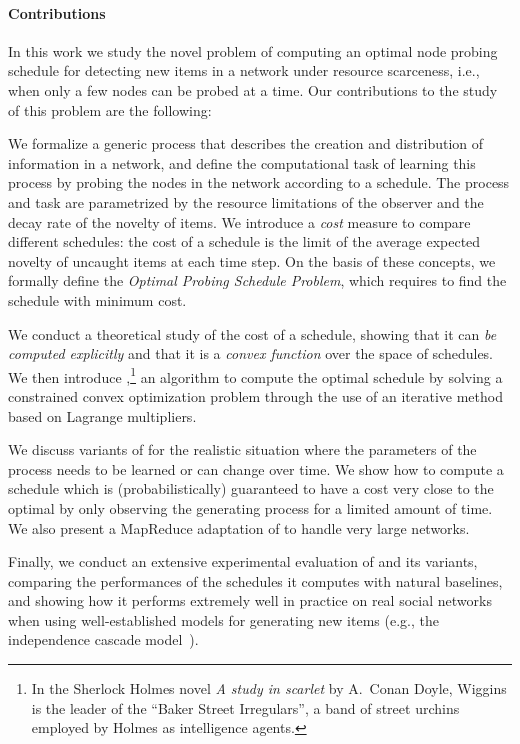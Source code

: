 \paragraph*{Contributions}
In this work we study the novel problem of computing an optimal node probing
schedule for detecting new items in a network under resource scarceness, i.e.,
when only a few nodes can be probed at a time. Our contributions to the study of
this problem are the following:

\begin{itemize*}
	\item We formalize a generic process that describes the creation and
		distribution of information in a network, and define the computational task of
		learning this process by probing the nodes in the network according to a
		schedule. The process and task are parametrized by the resource
		limitations of the observer and the decay rate of the novelty of
		items. We introduce a \emph{cost} measure to compare different
		schedules: the cost of a schedule is the limit of the average expected
		novelty of uncaught items at each time step. On the basis of
		these concepts,  we formally define the \emph{Optimal Probing Schedule
		Problem}, which requires to find the schedule with minimum cost.
	\item We conduct a theoretical study of the cost of a schedule, showing that
		it can \emph{be computed explicitly} and that it is a \emph{convex
		function} over the space of schedules. We then introduce
		\algoname,\footnote{In the Sherlock Holmes novel \emph{A study in
		scarlet} by A.~Conan Doyle, Wiggins is the leader of the ``Baker Street
		Irregulars'', a band of street urchins employed by Holmes as
		intelligence agents.} an algorithm to compute the optimal schedule by
		solving a constrained convex optimization problem through the use of an
		iterative method based on Lagrange multipliers.
	\item We discuss variants of \algoname for the realistic situation where
		the parameters of the process needs to be learned or can change over
		time. We show how to compute a schedule which is (probabilistically)
		guaranteed to have a cost very close to the optimal by only observing
		the generating process for a limited amount of time. We also present a
		MapReduce adaptation of \algoname to handle very large networks.
	\item Finally, we conduct an extensive experimental evaluation of \algoname
		and its variants, comparing the performances of the schedules it
		computes with natural baselines, and showing how it performs extremely
		well in practice on real social networks when using well-established
		models for generating new items (e.g., the independence cascade
		model~\citep{Kempe2003}).
\end{itemize*}

